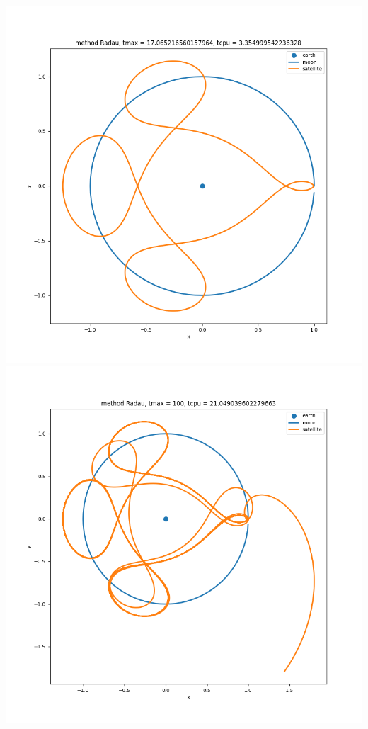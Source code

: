 \documentclass{article}
\begin{document}
\begin{enumerate}
\begin{enumerate}[label=(\alph*)]
\begin{center}
		\includegraphics[scale=.3]{hw2 p1c 5}
		\includegraphics[scale=.3]{hw2 p1c 6}
	\end{center}
	

\end{enumerate}
\end{enumerate}
\end{document}

